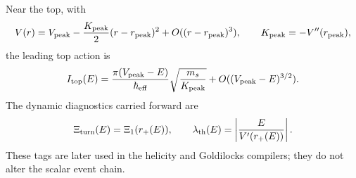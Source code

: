Near the top, with
\begin{equation}
\label{eq:app-part08-stage248-near-top}
V(r)=V_{\rm peak}-\frac{K_{\rm peak}}2(r-r_{\rm peak})^2+O((r-r_{\rm peak})^3),
\qquad
K_{\rm peak}=-V''(r_{\rm peak}),
\end{equation}
the leading top action is
\begin{equation}
\label{eq:app-part08-stage248-top-action}
I_{\rm top}(E)=
\frac{\pi(V_{\rm peak}-E)}{\hbar_{\rm eff}}
\sqrt{\frac{m_s}{K_{\rm peak}}}
+O((V_{\rm peak}-E)^{3/2}).
\end{equation}
The dynamic diagnostics carried forward are
\begin{equation}
\label{eq:app-part08-stage248-diagnostics}
\Xi_{\rm turn}(E)=\Xi_1(r_+(E)),
\qquad
\lambda_{\rm th}(E)=\left|\frac{E}{V'(r_+(E))}\right|.
\end{equation}
These tags are later used in the helicity and Goldilocks compilers; they do not alter the scalar event chain.
